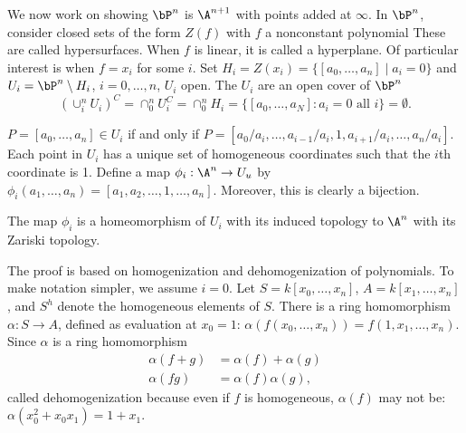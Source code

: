 We now work on showing $\bP^n$ is $\A^{n+1}$ with points added at $\infty$. In $\bP^n$, consider closed sets of the form $Z(f)$ with $f$ a nonconstant polynomial These are called hypersurfaces. When $f$ is linear, it is called a hyperplane. Of particular interest is when $f= x_i$ for some $i$. Set $H_i= Z(x_i)= \{[a_0,\ldots,a_n] \;|\; a_i=0 \}$ and $U_i= \bP^n \setminus H_i$, $i=0,\ldots,n$, $U_i$ open. The $U_i$ are an open cover of $\bP^n$
	\[
	(\cup_i^n U_i)^C= \cap_0^n U_i^C= \cap_0^n H_i= \{[a_0,\ldots,a_N] \colon a_i= 0 \text{ all }i\}= \emptyset. 
	\]











































$P= [a_0,\ldots,a_n] \in U_i$ if and only if $P= [a_0/a_i,\ldots,a_{i-1}/a_i,1,a_{i+1}/a_i,\ldots,a_n/a_i]$. Each point in $U_i$ has a unique set of homogeneous coordinates such that the $i$th coordinate is 1. Define a map $\phi_i: \A^n \to U_u$  by $\phi_i(a_1,\ldots,a_n)= [a_1,a_2,\ldots,1,\ldots,a_n]$. Moreover, this is clearly a bijection. 



\begin{prop}
The map $\phi_i$ is a homeomorphism of $U_i$ with its induced topology to $\A^n$ with its Zariski topology. 
\end{prop}

The proof is based on homogenization and dehomogenization of polynomials. To make notation simpler, we assume $i=0$. Let $S= k[x_0,\ldots,x_n]$, $A= k[x_1,\ldots,x_n]$, and $S^h$ denote the homogeneous elements of $S$. There is a ring homomorphism $\alpha: S \to A$, defined as evaluation at $x_0= 1$: $\alpha(f(x_0,\ldots,x_n))= f(1,x_1,\ldots,x_n)$. Since $\alpha$ is a ring homomorphism
	\[
	\begin{split}
	\alpha(f+g)&= \alpha(f)+\alpha(g) \\
	\alpha(fg)&= \alpha(f)\alpha(g),
	\end{split}
	\]
called dehomogenization because even if $f$ is homogeneous, $\alpha(f)$ may not be: $\alpha(x_0^2+x_0x_1)= 1+x_1$. 


